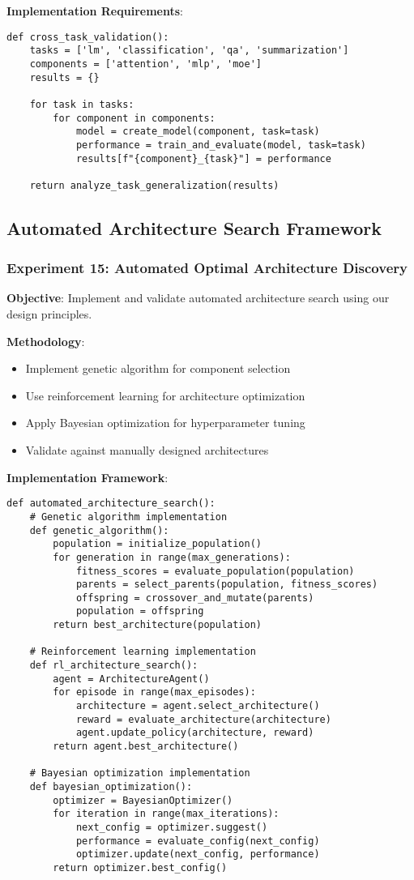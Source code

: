 \documentclass[11pt,a4paper]{article}
\begin{document}
\textbf{Implementation Requirements}:
\begin{verbatim}
def cross_task_validation():
    tasks = ['lm', 'classification', 'qa', 'summarization']
    components = ['attention', 'mlp', 'moe']
    results = {}
    
    for task in tasks:
        for component in components:
            model = create_model(component, task=task)
            performance = train_and_evaluate(model, task=task)
            results[f"{component}_{task}"] = performance
    
    return analyze_task_generalization(results)
\end{verbatim}

\subsection{Automated Architecture Search Framework}

\subsubsection{Experiment 15: Automated Optimal Architecture Discovery}
\textbf{Objective}: Implement and validate automated architecture search using our design principles.

\textbf{Methodology}:
\begin{itemize}
    \item Implement genetic algorithm for component selection
    \item Use reinforcement learning for architecture optimization
    \item Apply Bayesian optimization for hyperparameter tuning
    \item Validate against manually designed architectures
\end{itemize}

\textbf{Implementation Framework}:
\begin{verbatim}
def automated_architecture_search():
    # Genetic algorithm implementation
    def genetic_algorithm():
        population = initialize_population()
        for generation in range(max_generations):
            fitness_scores = evaluate_population(population)
            parents = select_parents(population, fitness_scores)
            offspring = crossover_and_mutate(parents)
            population = offspring
        return best_architecture(population)
    
    # Reinforcement learning implementation
    def rl_architecture_search():
        agent = ArchitectureAgent()
        for episode in range(max_episodes):
            architecture = agent.select_architecture()
            reward = evaluate_architecture(architecture)
            agent.update_policy(architecture, reward)
        return agent.best_architecture()
    
    # Bayesian optimization implementation
    def bayesian_optimization():
        optimizer = BayesianOptimizer()
        for iteration in range(max_iterations):
            next_config = optimizer.suggest()
            performance = evaluate_config(next_config)
            optimizer.update(next_config, performance)
        return optimizer.best_config()
\end{verbatim}
\end{document}
